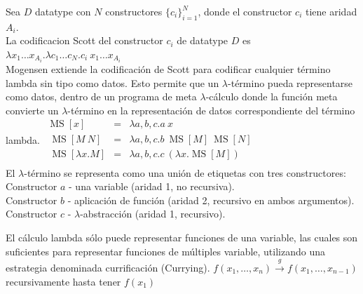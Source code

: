\begin{defn}\end{defn}
Sea $D$ datatype con $N$ constructores $\{c_i\}_{i=1}^N$, donde el constructor $c_i$ tiene aridad $A_i$. \\
La codificacion Scott del constructor $c_i$ de datatype $D$ es\\
$\lambda x_1 \dots x_{A_i} . \lambda c_1 \ldots c_N . c_i\ x_1 \dots x_{A_i}$\\
Mogensen extiende la codificación de Scott \cite{Mog1994} para codificar cualquier término lambda sin tipo como datos. Esto permite que un $\lambda$-término pueda representarse como datos, dentro de un programa de meta $\lambda$-cálculo donde la función meta convierte un $\lambda$-término en la representación de datos correspondiente del término lambda.
$\begin{array}{rcl}
\operatorname{MS}[x] & = & \lambda a, b, c.a\ x \\
\ \operatorname{MS}[M\ N] & = & \lambda a, b, c.b\ \operatorname{MS}[M]\ \operatorname{MS}[N] \\
\ \operatorname{MS}[\lambda x . M] & = & \lambda a, b, c.c\ (\lambda x.\operatorname{MS}[M]) \\
\end{array}$\vspace{0.2cm} \\
El $\lambda$-término se representa como una unión de etiquetas con tres constructores:\\
Constructor $a$ - una variable (aridad 1, no recursiva).\\
Constructor $b$ - aplicación de función (aridad 2, recursivo en ambos argumentos).\\
Constructor $c$ - $\lambda$-abstracción (aridad 1, recursivo).

\begin{note}
El cálculo lambda sólo puede representar funciones de una variable, 
las cuales son suficientes para representar funciones de múltiples variable, utilizando una estrategia denominada currificación (Currying).
$\displaystyle f(x_{1}, \dots, x_n) \xrightarrow{g} f(x_1, \dots, x_{n-1})$ recursivamente hasta tener $f(x_1)$
\end{note}

